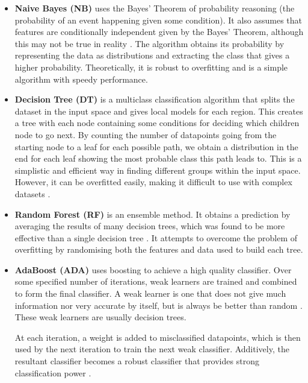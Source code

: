 \begin{itemize}
  \item \textbf{Naive Bayes (NB)} uses the Bayes' Theorem of probability reasoning (the probability of an event happening given some condition). It also assumes that features are conditionally independent given by the Bayes' Theorem, although this may not be true in reality \cite{mur-book}. The algorithm obtains its probability by representing the data as distributions and extracting the class that gives a higher probability. Theoretically, it is robust to overfitting and is a simple algorithm with speedy performance.

  \item \textbf{Decision Tree (DT)} is a multiclass classification algorithm that splits the dataset in the input space and gives local models for each region. This creates a tree with each node containing some conditions for deciding which children node to go next. By counting the number of datapoints going from the starting node to a leaf for each possible path, we obtain a distribution in the end for each leaf showing the most probable class this path leads to. This is a simplistic and efficient way in finding different groups within the input space. However, it can be overfitted easily, making it difficult to use with complex datasets \cite{mur-book}.

  \item \textbf{Random Forest (RF)} is an ensemble method. It obtains a prediction by averaging the results of many decision trees, which was found to be more effective than a single decision tree \cite{compare-supervised}. It attempts to overcome the problem of overfitting by randomising both the features and data used to build each tree.

  \item \textbf{AdaBoost (ADA)} uses boosting to achieve a high quality classifier. Over some specified number of iterations, weak learners are trained and combined to form the final classifier. A weak learner is one that does not give much information nor very accurate by itself, but is always be better than random \cite{mur-book}. These weak learners are usually decision trees. 
    
At each iteration, a weight is added to misclassified datapoints, which is then used by the next iteration to train the next weak classifier. Additively, the resultant classifier becomes a robust classifier that provides strong classification power \cite{boosting}.


\end{itemize}
